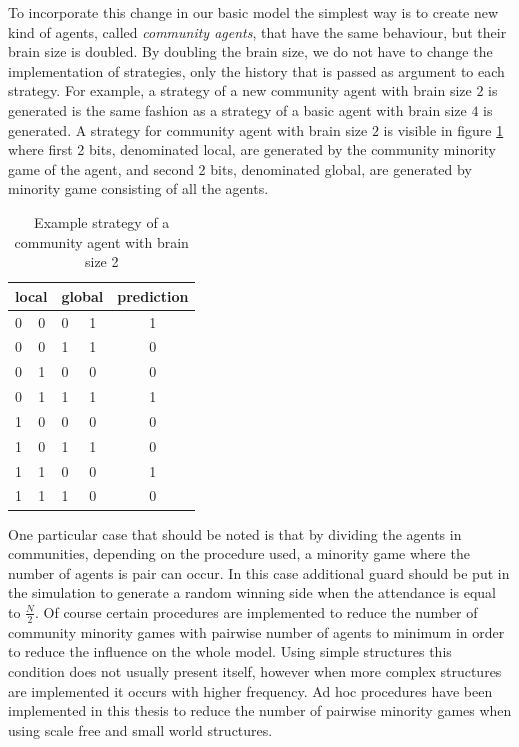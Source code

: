 To incorporate this change in our basic model the simplest way is to create new kind of agents, called \textit{community agents}, that have the same behaviour, but their brain size is doubled.
By doubling the brain size, we do not have to change the implementation of strategies, only the history that is passed as argument to each strategy. 
For example, a strategy of a new community agent with brain size $2$ is generated is the same fashion as a strategy of a basic agent with brain size $4$ is generated.
A strategy for community agent with brain size $2$ is visible in figure \ref{table:communityStrategy} where first 2 bits, denominated local, are generated by the community minority game of the agent, and second 2 bits, denominated global, are generated by minority game consisting of all the agents.

\begin{table}
\centering
\begin{tabular}{|l|l||l|l| |c|}
\hline
\multicolumn{2}{|c||}{local}&
\multicolumn{2}{|c||}{global}&
\multicolumn{1}{|c|}{prediction} \\
\hline
\hline
0 & 0 & 0 & 1 & 1   \\ \hline
0 & 0 & 1 & 1 & 0   \\ \hline
0 & 1 & 0 & 0 & 0   \\ \hline
0 & 1 & 1 & 1 & 1   \\ \hline
1 & 0 & 0 & 0 & 0   \\ \hline
1 & 0 & 1 & 1 & 0   \\ \hline
1 & 1 & 0 & 0 & 1   \\ \hline
1 & 1 & 1 & 0 & 0   \\ \hline
\end{tabular}
\caption{Example strategy of a community agent with brain size 2}
\label{table:communityStrategy}
\end{table}

One particular case that should be noted is that by dividing the agents in communities, depending on the procedure used, a minority game where the number of agents is pair can occur.
In this case additional guard should be put in the simulation to generate a random winning side when the attendance is equal to $\frac{N}{2}$.
Of course certain procedures are implemented to reduce the number of community minority games with pairwise number of agents to minimum in order to reduce the influence on the whole model. 
Using simple structures this condition does not usually present itself, however when more complex structures are implemented it occurs with higher frequency.
Ad hoc procedures have been implemented in this thesis to reduce the number of pairwise minority games when using scale free and small world structures.

